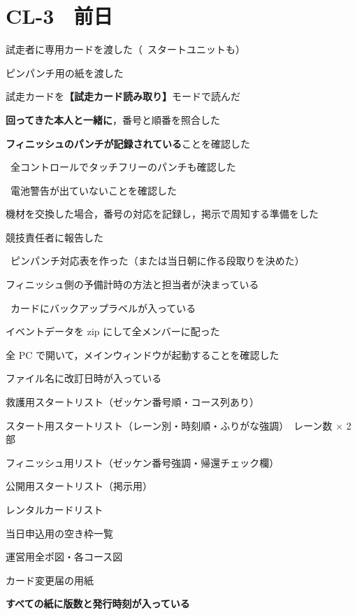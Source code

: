 \ckfoot

\clearpage
\section*{CL-3　前日}

\begin{cklist}
\item 試走者に専用カードを渡した（\tEMIT\ スタートユニットも）
\item ピンパンチ用の紙を渡した
\item 試走カードを\textbf{【試走カード読み取り】}モードで読んだ
\item \textbf{回ってきた本人と一緒に}，番号と順番を照合した
\item \textbf{フィニッシュのパンチが記録されている}ことを確認した
\item \tSIAC\ 全コントロールでタッチフリーのパンチも確認した
\item \tEMIT\ 電池警告が出ていないことを確認した
\item 機材を交換した場合，番号の対応を記録し，掲示で周知する準備をした
\item 競技責任者に報告した
\end{cklist}

\begin{cklist}
\item \tSI\ ピンパンチ対応表を作った（または当日朝に作る段取りを決めた）
\item フィニッシュ側の予備計時の方法と担当者が決まっている
\item \tEMIT\ カードにバックアップラベルが入っている
\end{cklist}

\begin{cklist}
\item イベントデータを zip にして全メンバーに配った
\item 全 PC で開いて，メインウィンドウが起動することを確認した
\item ファイル名に改訂日時が入っている
\end{cklist}

\begin{cklist}
\item 救護用スタートリスト（ゼッケン番号順・コース列あり）
\item スタート用スタートリスト（レーン別・時刻順・ふりがな強調）　レーン数 $\times$ 2 部
\item フィニッシュ用リスト（ゼッケン番号強調・帰還チェック欄）
\item 公開用スタートリスト（掲示用）
\item レンタルカードリスト
\item 当日申込用の空き枠一覧
\item 運営用全ポ図・各コース図
\item カード変更届の用紙
\item \textbf{すべての紙に版数と発行時刻が入っている}
\end{cklist}

